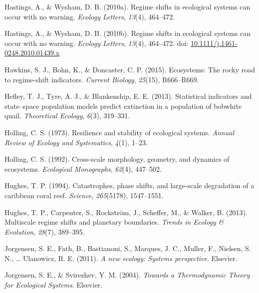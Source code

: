 \documentclass[12pt,twoside,openany]{reedthesis}
\begin{document}
\leavevmode\hypertarget{ref-hastings2010regime}{}%
Hastings, A., \& Wysham, D. B. (2010a). Regime shifts in ecological systems can occur with no warning. \emph{Ecology Letters}, \emph{13}(4), 464--472.

\leavevmode\hypertarget{ref-hastings_regime_2010}{}%
Hastings, A., \& Wysham, D. B. (2010b). Regime shifts in ecological systems can occur with no warning. \emph{Ecology Letters}, \emph{13}(4), 464--472. doi: \href{https://doi.org/10.1111/j.1461-0248.2010.01439.x}{10.1111/j.1461-0248.2010.01439.x}

\leavevmode\hypertarget{ref-hawkins2015ecosystems}{}%
Hawkins, S. J., Bohn, K., \& Doncaster, C. P. (2015). Ecosystems: The rocky road to regime-shift indicators. \emph{Current Biology}, \emph{25}(15), R666--R669.

\leavevmode\hypertarget{ref-hefley2013statistical}{}%
Hefley, T. J., Tyre, A. J., \& Blankenship, E. E. (2013). Statistical indicators and state--space population models predict extinction in a population of bobwhite quail. \emph{Theoretical Ecology}, \emph{6}(3), 319--331.

\leavevmode\hypertarget{ref-holling1973resilience}{}%
Holling, C. S. (1973). Resilience and stability of ecological systems. \emph{Annual Review of Ecology and Systematics}, \emph{4}(1), 1--23.

\leavevmode\hypertarget{ref-holling1992cross}{}%
Holling, C. S. (1992). Cross-scale morphology, geometry, and dynamics of ecosystems. \emph{Ecological Monographs}, \emph{62}(4), 447--502.

\leavevmode\hypertarget{ref-hughes_catastrophes_1994}{}%
Hughes, T. P. (1994). Catastrophes, phase shifts, and large-scale degradation of a caribbean coral reef. \emph{Science}, \emph{265}(5178), 1547--1551.

\leavevmode\hypertarget{ref-hughes2013multiscale}{}%
Hughes, T. P., Carpenter, S., Rockström, J., Scheffer, M., \& Walker, B. (2013). Multiscale regime shifts and planetary boundaries. \emph{Trends in Ecology \& Evolution}, \emph{28}(7), 389--395.

\leavevmode\hypertarget{ref-jorgensen_new_2011}{}%
Jorgensen, S. E., Fath, B., Bastianoni, S., Marques, J. C., Muller, F., Nielsen, S. N., \ldots{} Ulanowicz, R. E. (2011). \emph{A new ecology: Systems perspective}. Elsevier.

\leavevmode\hypertarget{ref-jorgensen_towards_2004}{}%
Jorgensen, S. E., \& Svirezhev, Y. M. (2004). \emph{Towards a Thermodynamic Theory for Ecological Systems}. Elsevier.
\end{document}
